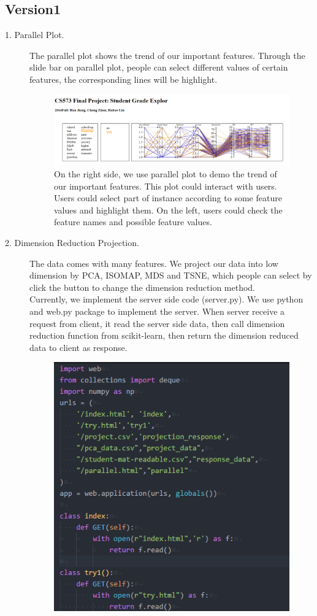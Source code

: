 \documentclass{article}
\begin{document}
\subsection{Version1}
\begin{description}
\item [1. Parallel Plot.] 
The parallel plot shows the trend of our important features. Through the slide bar on parallel plot, people can select different values of certain features, the corresponding lines will be highlight.
\begin{figure}[H]
\centering
\includegraphics[scale=0.4]{parallel.png}
\caption{On the right side, we use parallel plot to demo the trend of our important features. This plot could interact with users. Users could select part of instance according to some feature values and highlight them. On the left, users could check the feature names and possible feature values.}
\end{figure}
\item [2. Dimension Reduction Projection.]  
The data comes with many features. We project our data into low dimension by PCA, ISOMAP, MDS and TSNE, which people can select by click the button to change the dimension reduction method. \\
Currently, we implement the server side code (server.py). We use python and web.py package to implement the server. When server receive a request from client, it read the server side data, then call dimension reduction function from scikit-learn, then return the dimension reduced data to client as response.\\
\begin{figure}[H]
\centering
\includegraphics[scale=0.5]{server.png}

\end{figure}
\end{description}
\end{document}

